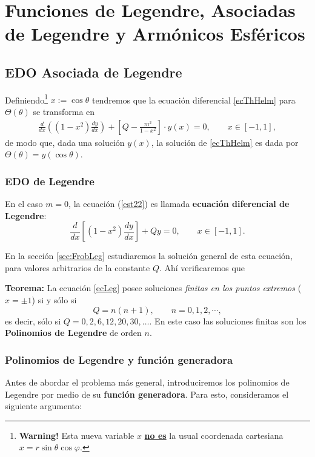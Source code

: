 \chapter{Funciones de Legendre, Asociadas de Legendre y Armónicos Esféricos}

\section{EDO Asociada de Legendre}
Definiendo\footnote{\textbf{Warning!} Esta nueva variable $x$ \underline{\textbf{no es}} la usual coordenada cartesiana $x=r\sin\theta\cos\varphi$.} $x:=\cos\theta$ tendremos que la ecuación diferencial \eqref{ecThHelm} para $\Theta(\theta)$ se transforma en 
\begin{eqnarray}
\frac{d}{dx}\left((1-x^2)\frac{dy}{dx}\right) +
\left[Q-\frac{m^2}{1-x^2}\right]\cdot y(x) = 0, \qquad x\in [-1,1],\label{est22}
\end{eqnarray}
de modo que, dada una solución $y(x)$, la solución de \eqref{ecThHelm} es dada por $\Theta(\theta)=y(\cos\theta)$. 

\subsection{EDO de Legendre}
En el caso $m=0$, la ecuación (\ref{est22}) es llamada \textbf{ecuación
diferencial de Legendre}:
\begin{equation}\label{ecLeg}
\frac{d}{dx}\left[\left(1-x^2 \right)\frac{dy}{dx}\right]+Qy=0, \qquad x\in [-1,1].
\end{equation}

 En la sección \ref{sec:FrobLeg} estudiaremos la solución general de esta ecuación, para valores arbitrarios de la constante $Q$. Ahí verificaremos que 
\begin{tcolorbox}
\textbf{Teorema:} La ecuación \eqref{ecLeg} posee soluciones \textit{finitas en los puntos extremos} ($x=\pm 1$) si y sólo si
\begin{equation}
Q=n(n+1),\qquad n=0, 1,2, \cdots,
\end{equation} 
es decir, sólo si $Q=0,2,6,12,20,30,\dots$. En este caso las soluciones finitas son los \textbf{Polinomios de Legendre} de orden $n$. 
\end{tcolorbox}

\subsection{Polinomios de Legendre y función generadora}
Antes de abordar el problema más general, introduciremos los polinomios de Legendre por medio de su \textbf{función generadora}. Para esto, consideramos el siguiente argumento:

